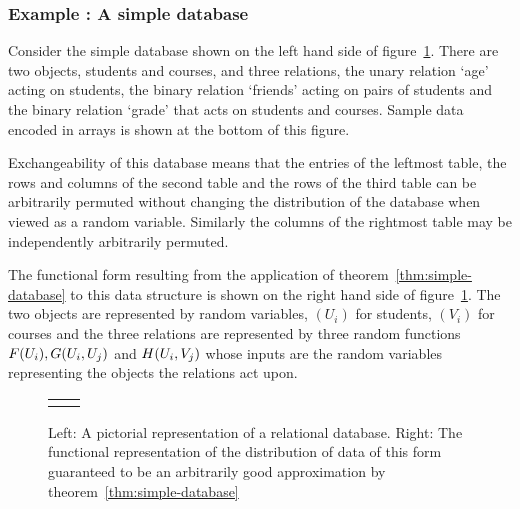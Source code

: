 %
\subsubsection{Example : A simple database}

Consider the simple database shown on the left hand side of figure~\ref{fig:multi-rel-seq}.
There are two objects, students and courses, and three relations, the unary relation `age' acting on students, the binary relation `friends' acting on pairs of students and the binary relation `grade' that acts on students and courses.
Sample data encoded in arrays is shown at the bottom of this figure.

Exchangeability of this database means that the entries of the leftmost table, the rows and columns of the second table and the rows of the third table can be arbitrarily permuted without changing the distribution of the database when viewed as a random variable.
Similarly the columns of the rightmost table may be independently arbitrarily permuted.

The functional form resulting from the application of theorem~\ref{thm:simple-database} to this data structure is shown on the right hand side of figure~\ref{fig:multi-rel-seq}.
The two objects are represented by \iid random variables, $(U_i)$ for students, $(V_i)$ for courses and the three relations are represented by three random functions $F(U_i),G(U_i,U_j)$ and $H(U_i,V_j)$ whose inputs are the random variables representing the objects the relations act upon.

\begin{figure}[ht]
\centering
\begin{tabular}{cc}
\tiny  & \tiny 
\end{tabular}
\caption{Left: A pictorial representation of a relational database. Right: The functional representation of the distribution of data of this form guaranteed to be an arbitrarily good approximation by theorem~\ref{thm:simple-database}}
\label{fig:multi-rel-seq}
\end{figure}

%
  
